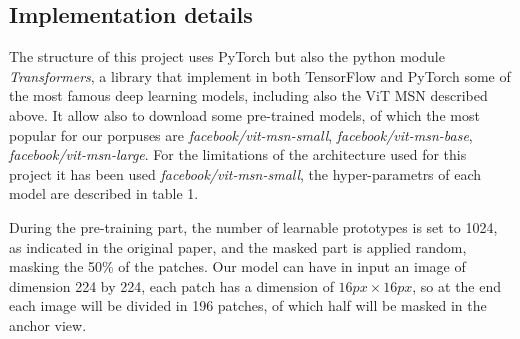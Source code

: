 \documentclass[column]{article}
\begin{document}
	\begin{multicols}{2}
		
		
	\section{Implementation details}
	
	The structure of this project uses PyTorch but also the python module \textit{Transformers}, a library that implement in both TensorFlow and PyTorch some of the most famous deep learning models, including also
	the ViT MSN described above. It allow also to download some pre-trained models, of which the most popular for our porpuses are \textit{facebook/vit-msn-small}, \textit{facebook/vit-msn-base}, \textit{facebook/vit-msn-large}. For the limitations of the architecture used for this project it has been used \textit{facebook/vit-msn-small}, the hyper-parametrs of each model are described in table 1.
	
	During the pre-training part, the number of learnable prototypes is set to 1024, as indicated in the original paper, and the masked part is applied random, masking the 50\% of the patches. Our model can have in input an image of dimension 224 by 224, each patch has a dimension of $16px \times 16px$, so at the end each image will be divided in 196 patches, of which half will be masked in the anchor view.
		
	\end{multicols}
	
	\begin{table}[ht]
			\centering
		\caption{ViT. models hyper-parameters}
		\label{tab:vit_specs}
	\end{table}
	
\end{document}
